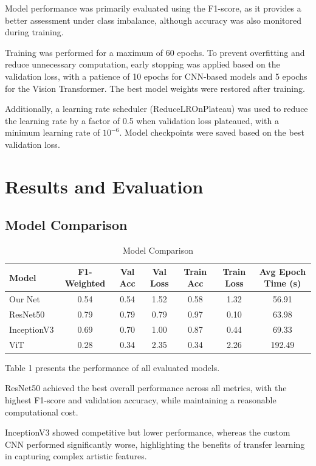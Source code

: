 \documentclass[12pt,a4paper]{article}
\begin{document}
Model performance was primarily evaluated using the F1-score, as it provides a better assessment under class imbalance, although accuracy was also monitored during training.

Training was performed for a maximum of 60 epochs. 
To prevent overfitting and reduce unnecessary computation, early stopping was applied based on the validation loss, with a patience of 10 epochs for CNN-based models and 5 epochs for the Vision Transformer. 
The best model weights were restored after training.

Additionally, a learning rate scheduler (ReduceLROnPlateau) was used to reduce the learning rate by a factor of 0.5 when validation loss plateaued, with a minimum learning rate of $10^{-6}$.
Model checkpoints were saved based on the best validation loss.

\section{Results and Evaluation}
\subsection{Model Comparison}

\begin{table}[h]
\centering
\caption{Model Comparison}
\vspace{0.3cm}
\begin{tabular}{|l|c|c|c|c|c|c|}
\hline
Model & F1-Weighted & Val Acc & Val Loss & Train Acc & Train Loss & Avg Epoch Time (s) \\
\hline
Our Net & 0.54 & 0.54 & 1.52 & 0.58 & 1.32 & 56.91  \\
ResNet50 & 0.79 & 0.79 & 0.79 & 0.97 & 0.10 & 63.98  \\
InceptionV3 & 0.69 & 0.70 & 1.00 & 0.87 & 0.44 & 69.33  \\
ViT & 0.28 & 0.34 & 2.35 & 0.34 & 2.26 & 192.49 \\
\hline
\end{tabular}
\end{table}


Table 1 presents the performance of all evaluated models. 

ResNet50 achieved the best overall performance across all metrics, with the highest F1-score and validation accuracy, while maintaining a reasonable computational cost. 

InceptionV3 showed competitive but lower performance, whereas the custom CNN performed significantly worse, highlighting the benefits of transfer learning in capturing complex artistic features. 
\end{document}
